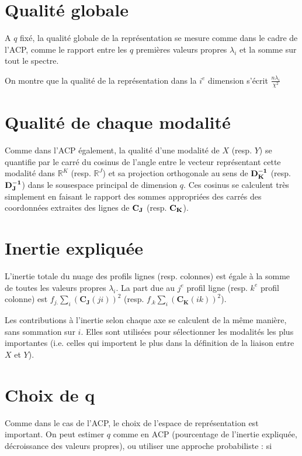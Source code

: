 \documentclass[letterpaper,10pt,english]{jupyterBook}
\begin{document}
\section{Qualité globale}
\label{\detokenize{afc:qualite-globale}}
\sphinxAtStartPar
A \(q\) fixé, la qualité globale de la représentation se mesure comme dans le cadre de l’ACP, comme le rapport entre les \(q\) premières valeurs propres \(\lambda_i\) et la somme sur tout le spectre.

\sphinxAtStartPar
On montre que la qualité de la représentation dans la \(i^e\) dimension s’écrit \(\frac{n\lambda_i}{\chi^2}\)


\section{Qualité de chaque modalité}
\label{\detokenize{afc:qualite-de-chaque-modalite}}
\sphinxAtStartPar
Comme dans l’ACP également, la qualité d’une modalité de \(X\) (resp. \(Y\)) se quantifie par le carré du cosinus de l’angle entre le vecteur représentant cette modalité dans \(\mathbb{R}^K\) (resp. \(\mathbb{R}^J\))  et sa projection orthogonale au sens de \({\bf D_K^{-1}}\) (resp. \({\bf D_J^{-1}}\)) dans le sous\sphinxhyphen{}espace principal de dimension \(q\). Ces cosinus se calculent très simplement en faisant le rapport des sommes appropriées des carrés des coordonnées extraites des lignes de \({\bf C_J}\) (resp. \({\bf C_K}\)).


\section{Inertie expliquée}
\label{\detokenize{afc:inertie-expliquee}}
\sphinxAtStartPar
L’inertie totale du nuage des profils lignes (resp. colonnes) est égale à la somme de toutes les valeurs propres \(\lambda_i\). La part due au \(j^e\) profil ligne (resp. \(k^e\) profil colonne) est \(f_{j.}\displaystyle\sum_i \left (\mathbf{C_J}(ji) \right )^2\) (resp. \(f_{.k}\displaystyle\sum_i \left (\mathbf{C_K}(ik) \right )^2\)).

\sphinxAtStartPar
Les contributions à l’inertie selon chaque axe se calculent de la même manière, sans sommation sur \(i\). Elles sont utilisées pour sélectionner les modalités les plus importantes (i.e. celles qui importent le plus dans la définition de la liaison entre \(X\) et \(Y\)).


\section{Choix de q}
\label{\detokenize{afc:choix-de-q}}
\sphinxAtStartPar
Comme dans le cas de l’ACP, le choix de l’espace de représentation est important. On peut estimer \(q\) comme en ACP (pourcentage de l’inertie expliquée, décroissance des valeurs propres), ou utiliser une approche probabiliste : si
\end{document}

